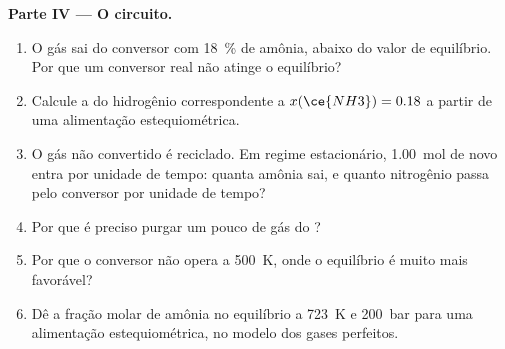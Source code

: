 \begin{problem}
\medskip
\noindent\textbf{Parte IV --- O circuito.}
\begin{enumerate}[resume]
  \item O gás sai do conversor com \qty{18}{\percent} de amônia, abaixo do
        valor de equilíbrio. Por que um conversor real não atinge o
        equilíbrio?
  \item Calcule a  do hidrogênio correspondente a
        $x(\ce{NH3}) = 0.18$ a partir de uma alimentação estequiométrica.
  \item O gás não convertido é reciclado. Em regime estacionário, \qty{1.00}{mol}
        de  novo entra por unidade de tempo: quanta amônia sai, e quanto
        nitrogênio passa pelo conversor por unidade de tempo?
  \item Por que é preciso purgar um pouco de gás do ?
  \item Por que o conversor não opera a \qty{500}{K}, onde o equilíbrio é
        muito mais favorável?
  \item Dê a fração molar de amônia no equilíbrio a \qty{723}{K} e
        \qty{200}{bar} para uma alimentação estequiométrica, no modelo dos
        gases perfeitos.
\end{enumerate}
\end{problem}
